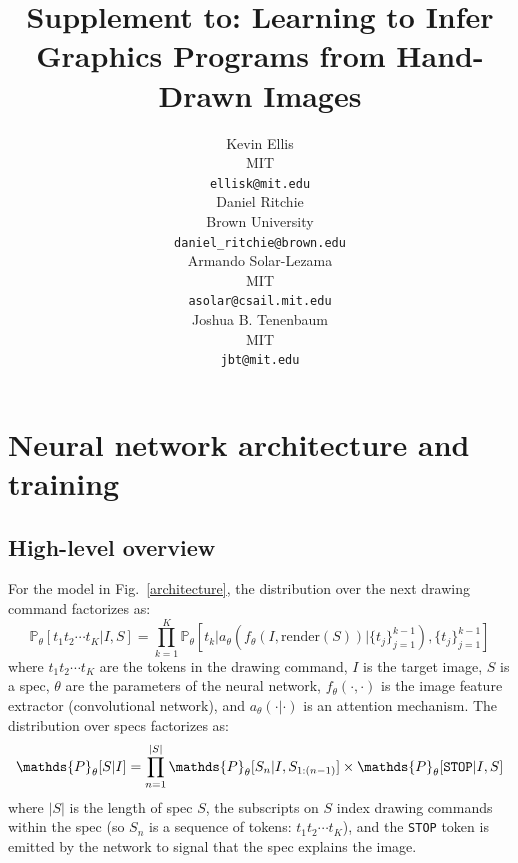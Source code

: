 \documentclass{article}
\title{Supplement to: Learning to Infer Graphics Programs from Hand-Drawn Images}
\author{
Kevin Ellis\\
  MIT\\
  \texttt{ellisk@mit.edu} \\
  \And
  Daniel Ritchie\\
Brown University\\
 \texttt{daniel\_ritchie@brown.edu} \\
 \And
 Armando Solar-Lezama\\
 MIT\\
\texttt{asolar@csail.mit.edu} \\
\And
Joshua B. Tenenbaum \\
MIT\\
\texttt{jbt@mit.edu}
}
\newcommand{\probability}{\mathds{P}} %
\begin{document}

\maketitle

\section{Neural network architecture and training}

\subsection{High-level overview}

For the model in Fig.~\ref{architecture}, the distribution over the next drawing command factorizes as:
\begin{equation}
  \probability_\theta [t_1t_2\cdots t_K | I,S] = \prod_{k = 1}^K \probability_\theta \left[t_k | a_\theta \left(f_\theta(I,\text{render}(S)) | \{t_j\}_{j = 1}^{k - 1}\right), \{t_j\}_{j = 1}^{k - 1}\right]
\end{equation}
where $t_1t_2\cdots t_K$ are the tokens in the drawing command, $I$ is
the target image, $S$ is a spec, $\theta$ are the
parameters of the neural network, $f_\theta(\cdot,\cdot)$ is the
image feature extractor (convolutional network), and $a_\theta(\cdot|\cdot)$ is an attention mechanism. The distribution over
specs factorizes as:
\begin{equation}
  \probability_\theta [S|I] = \prod_{n = 1}^{|S|} \probability_\theta [S_n | I,S_{1:(n-1)}]\times\probability_\theta [\verb|STOP| | I,S]\label{objective}
\end{equation}
where $|S|$ is the length of spec $S$, the subscripts
on $S$ index drawing commands within the spec (so $S_n$ is a sequence of tokens: $t_1t_2\cdots t_K$), and the \verb|STOP|
token is emitted by the network to signal that the spec
explains the image.
\tikzset{>=latex}
\end{document}
